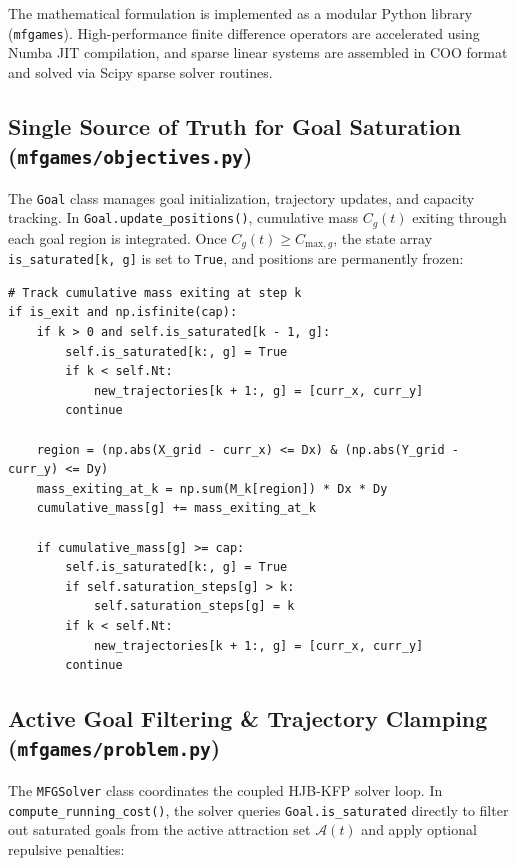 \documentclass[11pt,a4paper]{article}
\begin{document}
The mathematical formulation is implemented as a modular Python library (\texttt{mfgames}). High-performance finite difference operators are accelerated using Numba JIT compilation, and sparse linear systems are assembled in COO format and solved via Scipy sparse solver routines.

\subsection{Single Source of Truth for Goal Saturation (\texttt{mfgames/objectives.py})}
The \texttt{Goal} class manages goal initialization, trajectory updates, and capacity tracking. In \texttt{Goal.update_positions()}, cumulative mass $C_g(t)$ exiting through each goal region is integrated. Once $C_g(t) \ge C_{\text{max}, g}$, the state array \texttt{is_saturated[k, g]} is set to \texttt{True}, and positions are permanently frozen:

\begin{verbatim}
# Track cumulative mass exiting at step k
if is_exit and np.isfinite(cap):
    if k > 0 and self.is_saturated[k - 1, g]:
        self.is_saturated[k:, g] = True
        if k < self.Nt:
            new_trajectories[k + 1:, g] = [curr_x, curr_y]
        continue

    region = (np.abs(X_grid - curr_x) <= Dx) & (np.abs(Y_grid - curr_y) <= Dy)
    mass_exiting_at_k = np.sum(M_k[region]) * Dx * Dy
    cumulative_mass[g] += mass_exiting_at_k

    if cumulative_mass[g] >= cap:
        self.is_saturated[k:, g] = True
        if self.saturation_steps[g] > k:
            self.saturation_steps[g] = k
        if k < self.Nt:
            new_trajectories[k + 1:, g] = [curr_x, curr_y]
        continue
\end{verbatim}

\subsection{Active Goal Filtering \& Trajectory Clamping (\texttt{mfgames/problem.py})}
The \texttt{MFGSolver} class coordinates the coupled HJB-KFP solver loop. In \texttt{compute_running_cost()}, the solver queries \texttt{Goal.is_saturated} directly to filter out saturated goals from the active attraction set $\mathcal{A}(t)$ and apply optional repulsive penalties:
\end{document}

